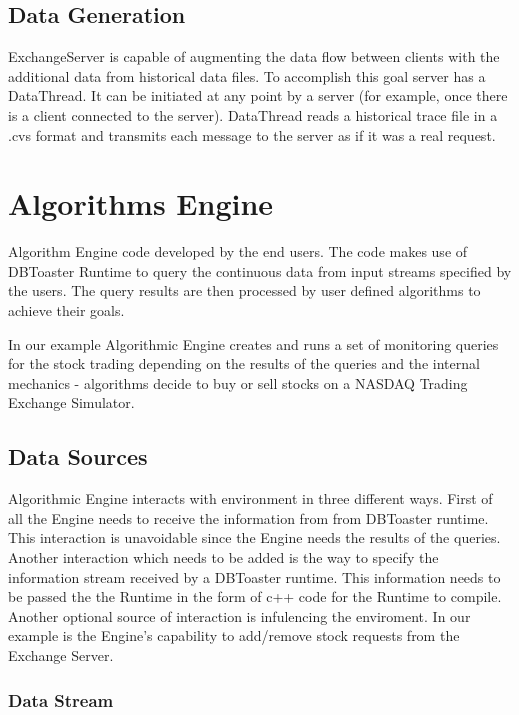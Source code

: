 \documentclass[11pt]{article}
\begin{document}
\subsection{Data Generation}

ExchangeServer is capable of augmenting the data flow between clients with the additional data from historical data files. To accomplish this goal server has a DataThread. It can be initiated at any point by a server (for example, once there is a client connected to the server). DataThread reads a historical trace file in a .cvs format and transmits each message to the server as if it was a real request.


\section{Algorithms Engine}

Algorithm Engine code developed by the end users. The code makes use of DBToaster Runtime to query the continuous data from input streams specified by the users. The query results are then processed by user defined algorithms to achieve their goals. 

In our example Algorithmic Engine creates and runs a set of monitoring queries for the stock trading depending on the results of the queries and the internal mechanics - algorithms decide to buy or sell stocks on a NASDAQ Trading Exchange Simulator.

\subsection{Data Sources}

Algorithmic Engine interacts with environment in three different ways. First of all the Engine needs to receive  the information from from DBToaster runtime. This interaction is unavoidable since the Engine needs the results of the queries. Another interaction which needs to be added is the way to specify the information stream received by a DBToaster runtime. This information needs to be passed the the Runtime in the form of c++ code for the Runtime to compile. Another optional source of interaction is infulencing the enviroment. In our example is the Engine's capability to add/remove stock requests from the Exchange Server. 

\subsubsection{Data Stream}
\end{document}
